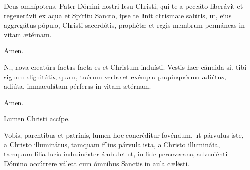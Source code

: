 
Deus omnípotens, Pater Dómini nostri Iesu Christi, qui te a peccáto liberávit et regenerávit ex aqua et
Spíritu Sancto, ipse te linit chrísmate salútis, ut, eius aggregátus pópulo, Christi sacerdótis,
prophétæ et regis membrum permáneas in vitam ætérnam.

 Amen.



 {\color{red}N.}, nova creatúra
\ifparvulus
factus
\else
facta
\fi
es et Christum induísti.
Vestis hæc cándida sit tibi signum dignitátis, quam, tuórum verbo et exémplo propinquórum
\ifparvulus
adiútus,
\else
adiúta,
\fi
immaculátam pérferas in vitam ætérnam.

 Amen.



 Lumen Christi accípe.


 Vobis, paréntibus et patrínis, lumen hoc concréditur fovéndum,
ut
\ifparvulus
párvulus iste, a Christo illuminátus, tamquam fílius
\else
párvula ista, a Christo illumináta, tamquam fília
\fi
lucis indesinénter ámbulet et, in fide persevérans, adveniénti Dómino occúrrere váleat
cum ómnibus Sanctis in aula cælésti.

